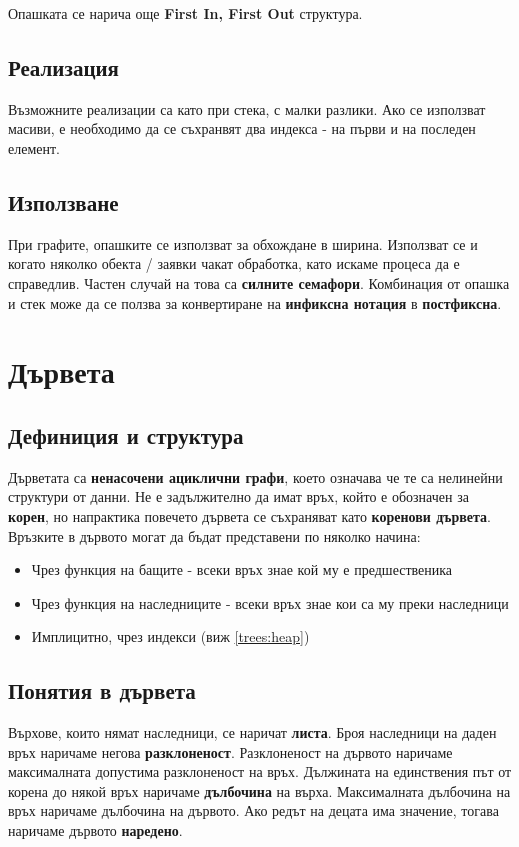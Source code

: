 \documentclass[fleqn,12pt]{article}
\begin{document}
Опашката се нарича още \textbf{First In, First Out} структура.

\subsection{Реализация}
Възможните реализации са като при стека, с малки разлики. Ако се използват масиви, е необходимо да се съхранвят два индекса - на първи и на последен елемент.

\subsection{Използване}
При графите, опашките се използват за обхождане в ширина. Използват се и когато няколко обекта / заявки чакат обработка, като искаме процеса да е справедлив.
Частен случай на това са \textbf{силните семафори}. Комбинация от опашка и стек може да се ползва за конвертиране на \textbf{инфиксна нотация} в \textbf{постфиксна}.

\section{Дървета}
\subsection{Дефиниция и структура}
Дърветата са \textbf{ненасочени ациклични графи}, което означава че те са нелинейни структури от данни. Не е задължително да имат връх, който е обозначен за \textbf{корен}, но
напрактика повечето дървета се съхраняват като \textbf{коренови дървета}. Връзките в дървото могат да бъдат представени по няколко начина:
\begin{itemize}
    \item Чрез функция на бащите - всеки връх знае кой му е предшественика
    \item Чрез функция на наследниците - всеки връх знае кои са му преки наследници
    \item Имплицитно, чрез индекси (виж \ref{trees:heap})
\end{itemize}

\subsection{Понятия в дървета}
Върхове, които нямат наследници, се наричат \textbf{листа}. Броя наследници на даден връх наричаме негова \textbf{разклоненост}.
Разклоненост на дървото наричаме максималната допустима разклоненост на връх. Дължината на единствения път от корена до някой връх
наричаме \textbf{дълбочина} на върха. Максималната дълбочина на връх наричаме дълбочина на дървото. Ако редът на децата има значение,
тогава наричаме дървото \textbf{наредено}.
\end{document}
